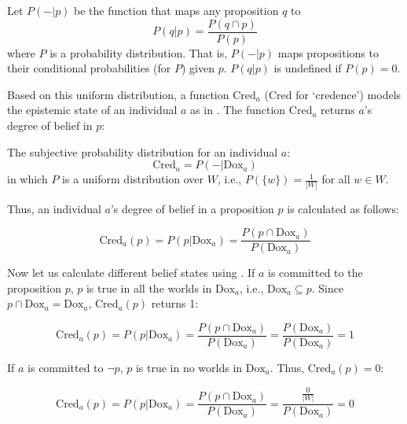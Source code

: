 \documentclass[output=paper,colorlinks,citecolor=brown]{langscibook}
\begin{document}
\ea\label{cprod} Let $P(-|p)$ be the function that maps any proposition $q$ to
    \begin{displaymath}
P(q|p) = \frac{P(q \cap p)}{P(p)}
\end{displaymath}
  where $P$ is a probability distribution. That is, $P(-|p)$ maps propositions to
their conditional probabilities (for $P$) given $p$. $P(q|p)$ is  undefined if $P(p) = 0$.
\z


Based on  this uniform distribution,  a function $\mathrm{Cred}_{a}$ ($\mathrm{Cred}$ for `credence')  models the epistemic state of an individual $a$ as in .
The function $\mathrm{Cred}_a$  returns $a$'s degree of belief in $p$:

\ea\label{credence} The subjective probability distribution for an individual $a$:
\begin{displaymath}
\mathrm{Cred}_a = P(-|\mathrm{Dox}_a)
\end{displaymath}
in which $P$ is a uniform distribution over $W$, i.e., $P(\{w\}) = \frac{1}{|W|}$ for all $w  \in
W$. 
\z


Thus, an individual $a$'s degree of belief in a proposition $p$ is calculated as follows: 


\ea\label{credencep} 
\begin{displaymath}
\mathrm{Cred}_a({p}) = P({p}|\mathrm{Dox}_a) = \frac{P({p} \cap \mathrm{Dox}_{{a}})}{P(\mathrm{Dox}_{{a}})}
\end{displaymath}
\z


  Now let us calculate   different belief states using . If  $a$ is committed to the proposition $p$, $p$ is true in all the  worlds in $\mathrm{Dox}_{a}$, i.e., $ \mathrm{Dox}_{{a}}\subseteq p$.  Since $p \cap  \mathrm{Dox}_{{a}} = \mathrm{Dox}_{a}$, $\mathrm{Cred}_{{a}}(p)$ returns 1:

  \ea  \begin{displaymath}
\mathrm{Cred}_{a}(p) = P(p|\mathrm{Dox}_{a}) = \frac{P(p \cap \mathrm{Dox}_{a})}{P(\mathrm{Dox}_{a})} = \frac{P(\mathrm{Dox}_{a})}{P(\mathrm{Dox}_{a})} = 1
\end{displaymath}
\z

 If $a$ is committed to $\neg p$, $p$ is true in no  worlds in $\mathrm{Dox}_{a}$. Thus, $\mathrm{Cred}_{a}(p)=0$:

  \ea  \begin{displaymath}
\mathrm{Cred}_{a}(p) = P(p|\mathrm{Dox}_{a}) = \frac{P(p \cap \mathrm{Dox}_{a})}{P(\mathrm{Dox}_{a})} = \frac{\frac{0}{|W|}}{P(\mathrm{Dox}_{a})} = 0
\end{displaymath}
\z
\end{document}
